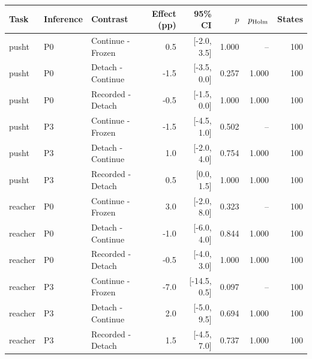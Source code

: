 \begin{tabular}{lllrrrrr}
\toprule
Task & Inference & Contrast & Effect (pp) & 95\% CI & $p$ & $p_{\rm Holm}$ & States \\
\midrule
pusht & P0 & Continue - Frozen & 0.5 & [-2.0, 3.5] & 1.000 & -- & 100 \\
pusht & P0 & Detach - Continue & -1.5 & [-3.5, 0.0] & 0.257 & 1.000 & 100 \\
pusht & P0 & Recorded - Detach & -0.5 & [-1.5, 0.0] & 1.000 & 1.000 & 100 \\
pusht & P3 & Continue - Frozen & -1.5 & [-4.5, 1.0] & 0.502 & -- & 100 \\
pusht & P3 & Detach - Continue & 1.0 & [-2.0, 4.0] & 0.754 & 1.000 & 100 \\
pusht & P3 & Recorded - Detach & 0.5 & [0.0, 1.5] & 1.000 & 1.000 & 100 \\
reacher & P0 & Continue - Frozen & 3.0 & [-2.0, 8.0] & 0.323 & -- & 100 \\
reacher & P0 & Detach - Continue & -1.0 & [-6.0, 4.0] & 0.844 & 1.000 & 100 \\
reacher & P0 & Recorded - Detach & -0.5 & [-4.0, 3.0] & 1.000 & 1.000 & 100 \\
reacher & P3 & Continue - Frozen & -7.0 & [-14.5, 0.5] & 0.097 & -- & 100 \\
reacher & P3 & Detach - Continue & 2.0 & [-5.0, 9.5] & 0.694 & 1.000 & 100 \\
reacher & P3 & Recorded - Detach & 1.5 & [-4.5, 7.0] & 0.737 & 1.000 & 100 \\
\bottomrule
\end{tabular}
